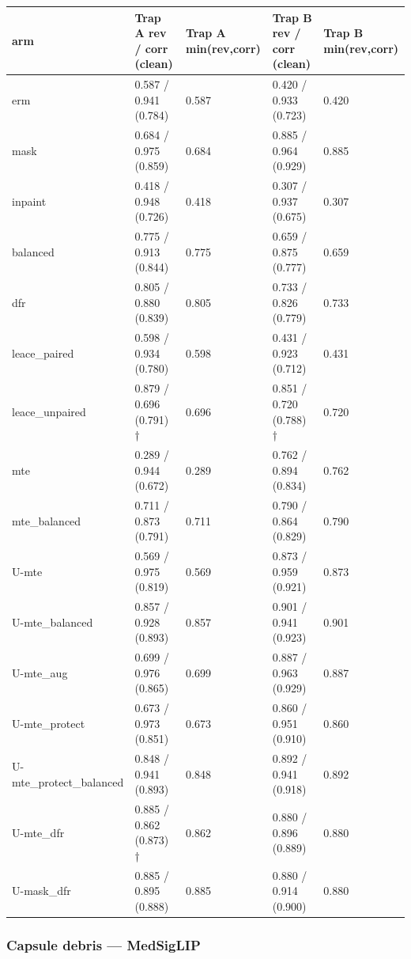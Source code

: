 {{ %
\begin{longtable}[]{@{}lllll@{}}
\toprule\noalign{}
arm & Trap A rev / corr (clean) & Trap A min(rev,corr) & Trap B rev / corr (clean) & Trap B min(rev,corr) \\
\midrule\noalign{}
\endhead
\bottomrule\noalign{}
\endlastfoot
erm & 0.587 / 0.941 (0.784) & 0.587 & 0.420 / 0.933 (0.723) & 0.420 \\
mask & 0.684 / 0.975 (0.859) & 0.684 & 0.885 / 0.964 (0.929) & 0.885 \\
inpaint & 0.418 / 0.948 (0.726) & 0.418 & 0.307 / 0.937 (0.675) & 0.307 \\
balanced & 0.775 / 0.913 (0.844) & 0.775 & 0.659 / 0.875 (0.777) & 0.659 \\
dfr & 0.805 / 0.880 (0.839) & 0.805 & 0.733 / 0.826 (0.779) & 0.733 \\
leace\_paired & 0.598 / 0.934 (0.780) & 0.598 & 0.431 / 0.923 (0.712) & 0.431 \\
leace\_unpaired & 0.879 / 0.696 (0.791) † & 0.696 & 0.851 / 0.720 (0.788) † & 0.720 \\
mte & 0.289 / 0.944 (0.672) & 0.289 & 0.762 / 0.894 (0.834) & 0.762 \\
mte\_balanced & 0.711 / 0.873 (0.791) & 0.711 & 0.790 / 0.864 (0.829) & 0.790 \\
U-mte & 0.569 / 0.975 (0.819) & 0.569 & 0.873 / 0.959 (0.921) & 0.873 \\
U-mte\_balanced & 0.857 / 0.928 (0.893) & 0.857 & 0.901 / 0.941 (0.923) & 0.901 \\
U-mte\_aug & 0.699 / 0.976 (0.865) & 0.699 & 0.887 / 0.963 (0.929) & 0.887 \\
U-mte\_protect & 0.673 / 0.973 (0.851) & 0.673 & 0.860 / 0.951 (0.910) & 0.860 \\
U-mte\_protect\_balanced & 0.848 / 0.941 (0.893) & 0.848 & 0.892 / 0.941 (0.918) & 0.892 \\
U-mte\_dfr & 0.885 / 0.862 (0.873) † & 0.862 & 0.880 / 0.896 (0.889) & 0.880 \\
U-mask\_dfr & 0.885 / 0.895 (0.888) & 0.885 & 0.880 / 0.914 (0.900) & 0.880 \\
\end{longtable}
}

\subsubsection{Capsule debris --- MedSigLIP}\label{capsule-debris--medsiglip}

}
